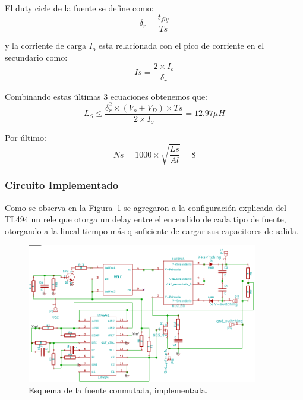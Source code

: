 El duty cicle de la fuente se define como:
$$
\delta_r= \frac{t_{fly}}{Ts}
$$

y la corriente de carga $I_o$ esta relacionada con el pico de corriente en el secundario
como:
$$
Is=\frac{2 \times I_o }{\delta_r}
$$

Combinando estas últimas 3 ecuaciones obtenemos que:
$$
L_S \leq \frac{\delta_r^2 \times (V_o + V_D) \times Ts}{2 \times I_o} =12.97\mu H
$$

Por último:
$$
Ns= 1000 \times \sqrt{\frac{Ls}{Al}}=8
$$
\medskip
\subsubsection{Circuito Implementado}

Como se observa en la Figura~\ref{conmutada_cir} se agregaron a la configuración explicada del TL494 un rele que otorga un delay entre el encendido de cada tipo de fuente, otorgando a la lineal tiempo más q suficiente de cargar sus capacitores de salida.

\begin{figure}[H]
\centering
\includegraphics[width=0.90\textwidth]{img/cir_conmutada.png}
\caption{Esquema  de la fuente conmutada, implementada.}
\label{conmutada_cir}
\end{figure}

\medskip
